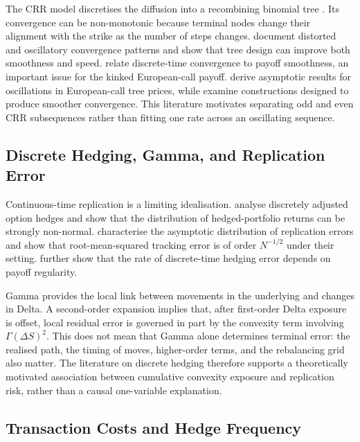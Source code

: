 \documentclass[11pt,a4paper]{article}
\begin{document}
The CRR model discretises the diffusion into a recombining binomial tree \citep{coxrossrubinstein1979}. Its convergence can be non-monotonic because terminal nodes change their alignment with the strike as the number of steps changes. \citet{leisenreimer1996} document distorted and oscillatory convergence patterns and show that tree design can improve both smoothness and speed. \citet{hestonzhou2000} relate discrete-time convergence to payoff smoothness, an important issue for the kinked European-call payoff. \citet{dienerdiener2004} derive asymptotic results for oscillations in European-call tree prices, while \citet{changpalmer2007} examine constructions designed to produce smoother convergence. This literature motivates separating odd and even CRR subsequences rather than fitting one rate across an oscillating sequence.

\subsection{Discrete Hedging, Gamma, and Replication Error}

Continuous-time replication is a limiting idealisation. \citet{boyleemanuel1980} analyse discretely adjusted option hedges and show that the distribution of hedged-portfolio returns can be strongly non-normal. \citet{bertsimaskoganlo2000} characterise the asymptotic distribution of replication errors and show that root-mean-squared tracking error is of order $N^{-1/2}$ under their setting. \citet{gobettemam2001} further show that the rate of discrete-time hedging error depends on payoff regularity.

Gamma provides the local link between movements in the underlying and changes in Delta. A second-order expansion implies that, after first-order Delta exposure is offset, local residual error is governed in part by the convexity term involving $\Gamma(\Delta S)^2$. This does not mean that Gamma alone determines terminal error: the realised path, the timing of moves, higher-order terms, and the rebalancing grid also matter. The literature on discrete hedging therefore supports a theoretically motivated association between cumulative convexity exposure and replication risk, rather than a causal one-variable explanation.

\subsection{Transaction Costs and Hedge Frequency}
\end{document}
